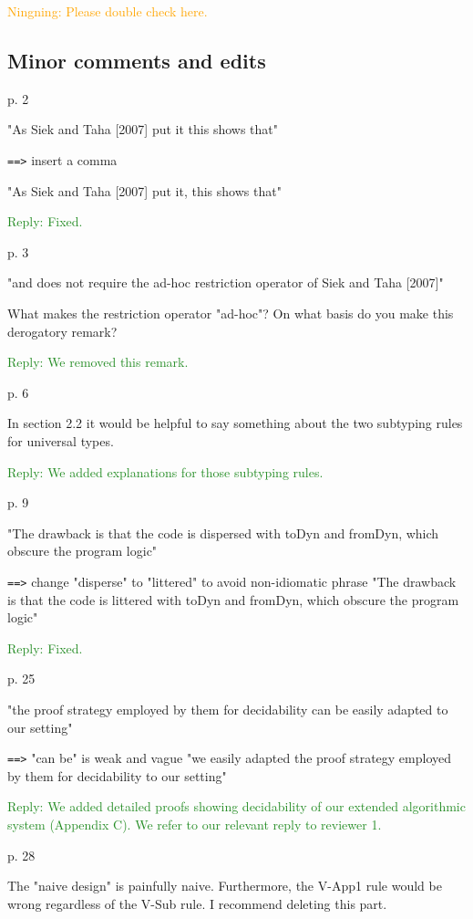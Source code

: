 \documentclass[dvipsnames]{article}
\newcommand\mynote[3]{\textcolor{#2}{#1: #3}}
\newcommand\bruno[1]{\mynote{Bruno}{red}{#1}}
\newcommand\ningning[1]{\mynote{Ningning}{orange}{#1}}
\newcommand\reply[1]{\textcolor{ForestGreen}{Reply: #1}}
\begin{document}
\ningning{Please double check here.}


\subsection{Minor comments and edits}

p. 2 

"As Siek and Taha [2007] put it this shows that"

\verb|==>| insert a comma 

"As Siek and Taha [2007] put it, this shows that" 

\reply{Fixed.}


p. 3 

"and does not require the ad-hoc restriction operator of Siek and Taha [2007]"

What makes the restriction operator "ad-hoc"? On what basis do you make this
derogatory remark?

\reply{We removed this remark.}

p. 6 

In section 2.2 it would be helpful to say something about the two subtyping
rules for universal types.

\reply{We added explanations for those subtyping rules.}


p. 9 

"The drawback is that the code is dispersed with toDyn and fromDyn, 
which obscure the program logic"

\verb|==>| change "disperse" to "littered" to avoid non-idiomatic phrase
"The drawback is that the code is littered with toDyn and fromDyn,
which obscure the program logic" 

\reply{Fixed.}


p. 25 

"the proof strategy employed by them for decidability can be easily 
adapted to our setting"

\verb|==>| "can be" is weak and vague
"we easily adapted the proof strategy employed by them for decidability 
to our setting" 

\reply{We added detailed proofs showing decidability of our extended algorithmic
  system (Appendix C). We refer to our relevant reply to reviewer 1. }


p. 28 

The "naive design" is painfully naive. Furthermore, the V-App1 rule would be
wrong regardless of the V-Sub rule. I recommend deleting this part.
\end{document}
